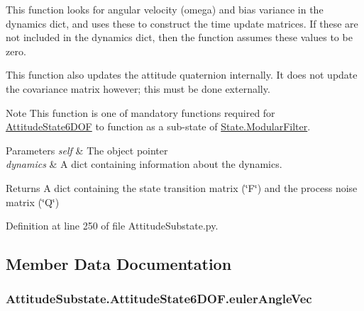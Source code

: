 This function looks for angular velocity (omega) and bias variance in the dynamics dict, and uses these to construct the time update matrices. If these are not included in the dynamics dict, then the function assumes these values to be zero.

This function also updates the attitude quaternion internally. It does not update the covariance matrix however; this must be done externally.

\begin{DoxyNote}{Note}
This function is one of mandatory functions required for \hyperlink{classAttitudeSubstate_1_1AttitudeState6DOF}{Attitude\+State6\+D\+OF} to function as a sub-\/state of \hyperlink{classState_1_1ModularFilter}{State.\+Modular\+Filter}.
\end{DoxyNote}

\begin{DoxyParams}{Parameters}
{\em self} & The object pointer \\
\hline
{\em dynamics} & A dict containing information about the dynamics.\\
\hline
\end{DoxyParams}
\begin{DoxyReturn}{Returns}
A dict containing the state transition matrix (\char`\"{}\+F\char`\"{}) and the process noise matrix (\char`\"{}\+Q\char`\"{}) 
\end{DoxyReturn}


Definition at line 250 of file Attitude\+Substate.\+py.



\subsection{Member Data Documentation}
\subsubsection[{\texorpdfstring{euler\+Angle\+Vec}{eulerAngleVec}}]{\setlength{\rightskip}{0pt plus 5cm}Attitude\+Substate.\+Attitude\+State6\+D\+O\+F.\+euler\+Angle\+Vec}\hypertarget{classAttitudeSubstate_1_1AttitudeState6DOF_af87f4ef871d05fbd84e7e7c91a2865a3}{}\label{classAttitudeSubstate_1_1AttitudeState6DOF_af87f4ef871d05fbd84e7e7c91a2865a3}


